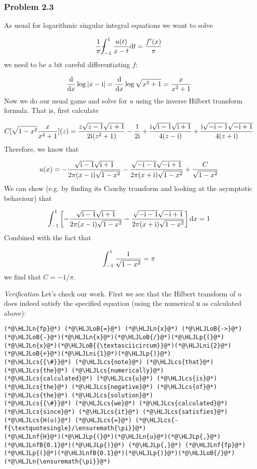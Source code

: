 \documentclass[12pt,a4paper]{article}
\newcommand{\HLJLn}[1]{#1}
\newcommand{\HLJLnf}[1]{\textcolor[RGB]{66,102,213}{#1}}
\newcommand{\HLJLnfB}[1]{\textcolor[RGB]{59,151,46}{#1}}
\newcommand{\HLJLni}[1]{\textcolor[RGB]{59,151,46}{#1}}
\newcommand{\HLJLoB}[1]{\textcolor[RGB]{102,102,102}{\textbf{#1}}}
\newcommand{\HLJLp}[1]{#1}
\newcommand{\HLJLcs}[1]{\textcolor[RGB]{153,153,119}{\textit{#1}}}
\def\D{ {\rm d} }
\def\I{ {\rm i} }
\def\Xint#1{ \mathchoice
   {\XXint\displaystyle\textstyle{#1} }%
   {\XXint\textstyle\scriptstyle{#1} }%
   {\XXint\scriptstyle\scriptscriptstyle{#1} }%
   {\XXint\scriptscriptstyle\scriptscriptstyle{#1} }%
   \!\int}
\def\XXint#1#2#3{ {\setbox0=\hbox{$#1{#2#3}{\int}$}
     \vcenter{\hbox{$#2#3$}}\kern-.5\wd0} }
\def\dashint{\Xint-}
\def\dx{\D x}
\def\dt{\D t}
\begin{document}
\subsubsection{Problem 2.3}
As usual for logarithmic singular integral equations we want to solve

\[
{1 \over \pi} \dashint_{-1}^1 {u(t)  \over x-t} \dt = {f'(x)  \over \pi}
\]
we need to be a bit careful differentiating $f$:

\[
{\D \over \dx} \log|x-\I| = {\D \over \dx} \log\sqrt{x^2 + 1} = { x \over x^2 + 1}
\]
Now we do our usual game and solve for $u$ using the inverse Hilbert transform formula. That is, first calculate

\[
C[\sqrt{1-x^2} {x \over x^2+1}](z) = {z \sqrt{z-1} \sqrt{z+1} \over 2\I (z^2+1)} - {1 \over 2 \I} + {\I \sqrt{\I - 1} \sqrt{\I+1} \over 4 (z-\I)} +  {\I \sqrt{-\I - 1} \sqrt{-\I+1} \over 4 (z+\I)}
\]
Therefore, we know that

\[
u(x) =  -{\sqrt{\I - 1} \sqrt{\I+1} \over 2 \pi (x-\I)\sqrt{1-x^2}} -  {\sqrt{-\I - 1} \sqrt{-\I+1} \over 2 \pi (x+\I) \sqrt{1-x^2}} + {C \over \sqrt{1-x^2}}
\]
We can show (e.g. by finding its Cauchy transform and looking at the asymptotic behaviour) that

\[
\int_{-1}^1\left[- {\sqrt{\I - 1} \sqrt{\I+1} \over 2 \pi (x-\I)\sqrt{1-x^2}} -  {\sqrt{-\I - 1} \sqrt{-\I+1} \over 2 \pi (x+\I) \sqrt{1-x^2}} \right]\dx = 1
\]
Combined with the fact that

\[
\int_{-1}^1 {1 \over \sqrt{1-x^2}} = \pi
\]
we find that $C = -1/\pi$.

\emph{Verification} Let's check our work. First we see that the Hilbert transform of $u$ does indeed satisfy the specified equation (using the numerical \texttt{u} as calculated above):


\begin{lstlisting}
(*@\HLJLn{fp}@*) (*@\HLJLoB{=}@*) (*@\HLJLn{x}@*) (*@\HLJLoB{->}@*) (*@\HLJLoB{-}@*)(*@\HLJLn{x}@*)(*@\HLJLoB{/}@*)(*@\HLJLp{(}@*)(*@\HLJLn{x}@*)(*@\HLJLoB{{\textasciicircum}}@*)(*@\HLJLni{2}@*)(*@\HLJLoB{+}@*)(*@\HLJLni{1}@*)(*@\HLJLp{)}@*)
(*@\HLJLcs{{\#}}@*) (*@\HLJLcs{note}@*) (*@\HLJLcs{that}@*) (*@\HLJLcs{the}@*) (*@\HLJLcs{numerically}@*) (*@\HLJLcs{calculated}@*) (*@\HLJLcs{u}@*) (*@\HLJLcs{is}@*) (*@\HLJLcs{the}@*) (*@\HLJLcs{negative}@*) (*@\HLJLcs{of}@*) (*@\HLJLcs{the}@*) (*@\HLJLcs{solution}@*)
(*@\HLJLcs{{\#}}@*) (*@\HLJLcs{we}@*) (*@\HLJLcs{calculated}@*) (*@\HLJLcs{since}@*) (*@\HLJLcs{it}@*) (*@\HLJLcs{satisfies}@*) (*@\HLJLcs{H(u)}@*) (*@\HLJLcs{=}@*) (*@\HLJLcs{-f{\textquotesingle}/\ensuremath{\pi}}@*)
(*@\HLJLnf{H}@*)(*@\HLJLp{(}@*)(*@\HLJLn{u}@*)(*@\HLJLp{,}@*) (*@\HLJLnfB{0.1}@*)(*@\HLJLp{)}@*) (*@\HLJLp{,}@*) (*@\HLJLnf{fp}@*)(*@\HLJLp{(}@*)(*@\HLJLnfB{0.1}@*)(*@\HLJLp{)}@*)(*@\HLJLoB{/}@*)(*@\HLJLn{\ensuremath{\pi}}@*)
\end{lstlisting}
\end{document}
